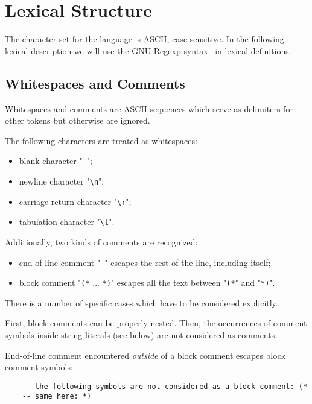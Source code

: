 \section{Lexical Structure}
\label{sec:lexical_structure}

The character set for the language is \textsc{ASCII}, case-sensitive. In the following lexical description we will use
the GNU Regexp syntax~\cite{GNULib} in lexical definitions.

\subsection{Whitespaces and Comments}

Whitespaces and comments are \textsc{ASCII} sequences which serve as delimiters for other tokens but otherwise are
ignored.

The following characters are treated as whitespaces:

\begin{itemize}
\item blank character "\texttt{ }";
\item newline character "\texttt{\textbackslash n}";
\item carriage return character "\texttt{\textbackslash r}";
\item tabulation character "\texttt{\textbackslash t}".
\end{itemize}

Additionally, two kinds of comments are recognized:

\begin{itemize}
\item end-of-line comment "\texttt{--}" escapes the rest of the line, including itself;
\item block comment "\texttt{(*} ... \texttt{*)}" escapes all the text between
  "\texttt{(*}" and "\texttt{*)}".
\end{itemize}

There is a number of specific cases which have to be considered explicitly.

First, block comments can be properly nested. Then, the occurrences of comment symbols inside string literals (see below) are not
considered as comments.

End-of-line comment encountered \emph{outside} of a block comment escapes block comment symbols:

\begin{lstlisting}
    -- the following symbols are not considered as a block comment: (*
    -- same here: *)
\end{lstlisting}

